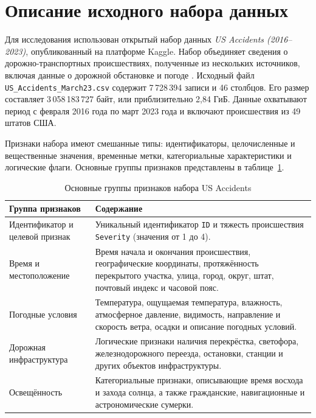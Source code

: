 \vspace{\baselineskip}
\section{Описание исходного набора данных}
\vspace{\baselineskip}

Для исследования использован открытый набор данных \textit{US Accidents (2016--2023)}, опубликованный на платформе Kaggle. Набор объединяет сведения о дорожно-транспортных происшествиях, полученные из нескольких источников, включая данные о дорожной обстановке и погоде \cite{moosavi2023usaccidents}. Исходный файл \texttt{US\_Accidents\_March23.csv} содержит 7\,728\,394 записи и 46 столбцов. Его размер составляет 3\,058\,183\,727 байт, или приблизительно 2,84 ГиБ. Данные охватывают период с февраля 2016 года по март 2023 года и включают происшествия из 49 штатов США.

Признаки набора имеют смешанные типы: идентификаторы, целочисленные и вещественные значения, временные метки, категориальные характеристики и логические флаги. Основные группы признаков представлены в таблице~\ref{tab:dataset-groups}.

\begin{table}[H]
    \centering
    \caption{Основные группы признаков набора US Accidents}
    \label{tab:dataset-groups}
    \small
    \begin{tabular}{|p{}|p{}|}
        \hline
        \centering Группа признаков & \centering\arraybackslash Содержание \\
        \hline
        Идентификатор и целевой признак & Уникальный идентификатор \texttt{ID} и тяжесть происшествия \texttt{Severity} (значения от 1 до 4). \\
        \hline
        Время и местоположение & Время начала и окончания происшествия, географические координаты, протяжённость перекрытого участка, улица, город, округ, штат, почтовый индекс и часовой пояс. \\
        \hline
        Погодные условия & Температура, ощущаемая температура, влажность, атмосферное давление, видимость, направление и скорость ветра, осадки и описание погодных условий. \\
        \hline
        Дорожная инфраструктура & Логические признаки наличия перекрёстка, светофора, железнодорожного переезда, остановки, станции и других объектов инфраструктуры. \\
        \hline
        Освещённость & Категориальные признаки, описывающие время восхода и захода солнца, а также гражданские, навигационные и астрономические сумерки. \\
        \hline
    \end{tabular}
\end{table}

